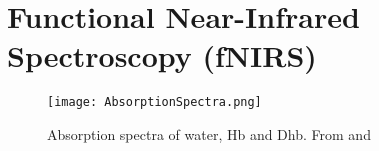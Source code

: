 \chapter{Functional Near-Infrared Spectroscopy (fNIRS)}

\begin{figure}[b]
  \begin{center}
    \texttt{[image: AbsorptionSpectra.png]}
  \end{center}
  \caption{\label{fig:fnirabsorption} Absorption spectra of water, Hb and Dhb.  From \cite{cope_1991} and \cite{horecker}}
\end{figure}